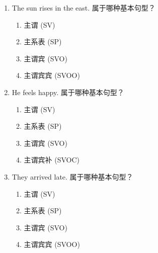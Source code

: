 \documentclass[11pt,a4paper]{ctexart}
\begin{document}
\begin{enumerate}[leftmargin=*,itemsep=4pt]
\begin{enumerate}[label=\Alph*.,leftmargin=2em,itemsep=1pt,topsep=2pt]
\item 主谓宾 (SVO)
\item 主谓宾补 (SVOC)
\end{enumerate}
\item The sun rises in the east. 属于哪种基本句型？
\begin{enumerate}[label=\Alph*.,leftmargin=2em,itemsep=1pt,topsep=2pt]
\item 主谓 (SV)
\item 主系表 (SP)
\item 主谓宾 (SVO)
\item 主谓宾宾 (SVOO)
\end{enumerate}
\item He feels happy. 属于哪种基本句型？
\begin{enumerate}[label=\Alph*.,leftmargin=2em,itemsep=1pt,topsep=2pt]
\item 主谓 (SV)
\item 主系表 (SP)
\item 主谓宾 (SVO)
\item 主谓宾补 (SVOC)
\end{enumerate}
\item They arrived late. 属于哪种基本句型？
\begin{enumerate}[label=\Alph*.,leftmargin=2em,itemsep=1pt,topsep=2pt]
\item 主谓 (SV)
\item 主系表 (SP)
\item 主谓宾 (SVO)
\item 主谓宾宾 (SVOO)
\end{enumerate}
\end{enumerate}
\end{document}
